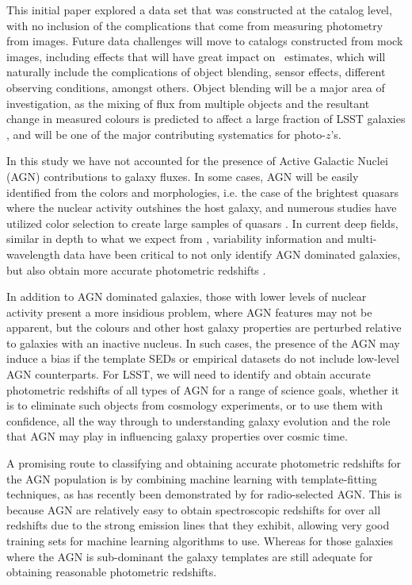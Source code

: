 This initial paper explored a data set that was constructed at the catalog level, with no inclusion of the complications that come from measuring photometry from images.
Future data challenges will move to catalogs constructed from mock images, including effects that will have great impact on \pz\ estimates, which will naturally include the complications of object blending, sensor effects, different observing conditions, amongst others.
Object blending will be a major area of investigation, as the mixing of flux from multiple objects and the resultant change in measured colours is predicted to affect a large fraction of LSST galaxies \citep{Dawson:2016}, and will be one of the major contributing systematics for photo-$z$'s.

In this study we have not accounted for the presence of Active Galactic Nuclei (AGN) contributions to galaxy fluxes.
In some cases, AGN will be easily identified from the colors and morphologies, i.e. the case of the brightest quasars where the nuclear activity outshines the host galaxy, and numerous studies have utilized color selection to create large samples of quasars \citep[e.g.][]{Richards:06,Maddox:08,Richards:15}.
In current deep fields, similar in depth to what we expect from \lsst, variability information and multi-wavelength data have been critical to not only identify AGN dominated galaxies, but also obtain more accurate photometric redshifts \citep[e.g][]{Salvato:11}.

In addition to AGN dominated galaxies, those with lower levels of nuclear activity present a more insidious problem, where AGN features may not be apparent, but the colours and other host galaxy properties are perturbed relative to galaxies with an inactive nucleus.
In such cases, the presence of the AGN may induce a bias if the template SEDs or empirical datasets do not include low-level AGN counterparts.
For LSST, we will need to identify and obtain accurate photometric redshifts of all types of AGN for a range of science goals, whether it is to eliminate such objects from cosmology experiments, or to use them with confidence, all the way through to understanding galaxy evolution and the role that AGN may play in influencing galaxy properties over cosmic time.

A promising route to classifying and obtaining accurate photometric redshifts for the AGN population is by combining machine learning with template-fitting techniques, as has recently been demonstrated by \citet{Duncan:18} for radio-selected AGN.
This is because AGN are relatively easy to obtain spectroscopic redshifts for over all redshifts due to the strong emission lines that they exhibit, allowing very good training sets for machine learning algorithms to use.
Whereas for those galaxies where the AGN is sub-dominant the galaxy templates are still adequate for obtaining reasonable photometric redshifts.


